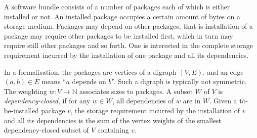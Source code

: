 \documentclass[12pt]{article}
\newcommand{\mbb}{\mathbb}
\begin{document}
A software bundle consists of a number of packages each of which is
either installed or not. An installed package occupies a certain
amount of bytes on a storage medium. Packages may depend on other
packages, that is installation of a package may require other packages
to be installed first, which in turn may require still other packages
and so forth. One is interested in the complete storage requirement
incurred by the installation of one package and all its dependencies.

In a formalisation, the packages are vertices of a digraph $(V,E)$, and an
edge $(a,b)\in E$ means ``$a$ depends on $b$''. Such a digraph is typically
not symmetric. The weighting $w\colon V\to\mbb{N}$ associates sizes to
packages. A subset $W$ of $V$ is \emph{dependency-closed}, if for any
$w\in W$, all dependencies of $w$ are in $W$. Given a to-be-installed
package $v$, the storage requirement incurred by the installation of
$v$ and all its dependencies is the sum of the vertex weights of the
smallest dependency-closed subset of $V$ containing $v$.
\end{document}
